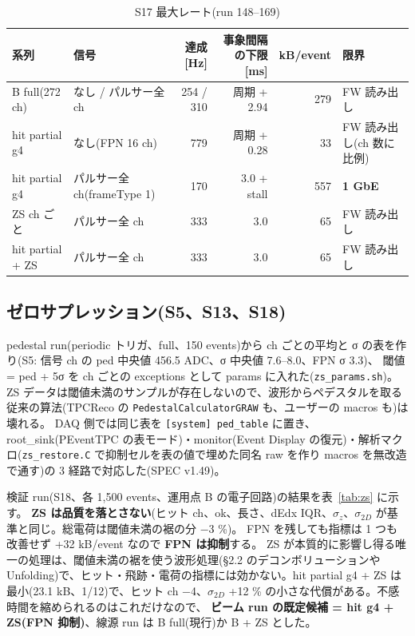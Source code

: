 \documentclass[a4paper,11pt]{ltjsarticle}
\begin{document}
\begin{table}[h]\centering\small
\caption{S17 最大レート(run 148--169)}
\footnotesize
\begin{tabular}{llrrrl}
\toprule
系列 & 信号 & 達成 [Hz] & 事象間隔の下限 [ms] & kB/event & 限界 \\
\midrule
B full(272 ch) & なし / パルサー全 ch & 254 / 310 & 周期 + 2.94 & 279 & FW 読み出し \\
hit partial g4 & なし(FPN 16 ch) & 779 & 周期 + 0.28 & 33 & FW 読み出し(ch 数に比例) \\
hit partial g4 & パルサー全 ch(frameType 1) & 170 & 3.0 + stall & 557 & \textbf{1 GbE} \\
ZS ch ごと & パルサー全 ch & 333 & 3.0 & 65 & FW 読み出し \\
hit partial + ZS & パルサー全 ch & 333 & 3.0 & 65 & FW 読み出し \\
\bottomrule
\end{tabular}
\end{table}

\subsection{ゼロサプレッション(S5、S13、S18)}
pedestal run(periodic トリガ、full、150 events)から ch ごとの平均と σ の表を作り(S5: 信号 ch の ped 中央値 456.5 ADC、σ 中央値 7.6--8.0、FPN σ 3.3)、
閾値 = ped + 5σ を ch ごとの exceptions として params に入れた(\texttt{zs\_params.sh})。
ZS データは閾値未満のサンプルが存在しないので、波形からペデスタルを取る従来の算法(TPCReco の \texttt{PedestalCalculatorGRAW} も、ユーザーの macros も)は壊れる。
DAQ 側では同じ表を \texttt{[system] ped\_table} に置き、root\_sink(PEventTPC の表モード)・monitor(Event Display の復元)・解析マクロ(\texttt{zs\_restore.C} で抑制セルを表の値で埋めた同名 raw を作り macros を無改造で通す)の 3 経路で対応した(SPEC v1.49)。

検証 run(S18、各 1,500 events、運用点 B の電子回路)の結果を表~\ref{tab:zs} に示す。
\textbf{ZS は品質を落とさない}(ヒット ch、ok、長さ、dEdx IQR、$\sigma_z$、$\sigma_{2D}$ が基準と同じ。総電荷は閾値未満の裾の分 −3 \%)。
FPN を残しても指標は 1 つも改善せず +32 kB/event なので \textbf{FPN は抑制}する。
ZS が本質的に影響し得る唯一の処理は、閾値未満の裾を使う波形処理(§2.2 のデコンボリューションや Unfolding)で、ヒット・飛跡・電荷の指標には効かない。hit partial g4 + ZS は最小(23.1 kB、1/12)で、ヒット ch −4、$\sigma_{2D}$ +12 \% の小さな代償がある。不感時間を縮められるのはこれだけなので、
\textbf{ビーム run の既定候補 = hit g4 + ZS(FPN 抑制)}、線源 run は B full(現行)か B + ZS とした。
\end{document}
